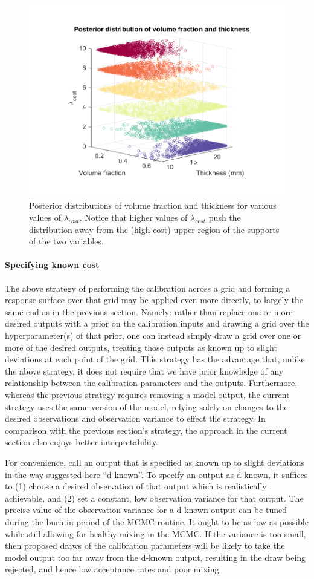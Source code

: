 \documentclass{article}
\begin{document}
\begin{figure}
\centering
\captionsetup{width=.7\linewidth}
\includegraphics[width=.65\linewidth]{FIG_post_dist_across_cost_lambda-3d}
\caption{Posterior distributions of volume fraction and thickness for various values of $\lambda_{cost}.$ Notice that higher values of $\lambda_{cost}$ push the distribution away from the (high-cost) upper region of the supports of the two variables.}
\label{fig:post_dists_lambda_cost}
\end{figure}


\paragraph{Specifying known cost}\label{known_cost}

The above strategy of performing the calibration across a grid and forming a response surface over that grid may be applied even more directly, to largely the same end as in the previous section. Namely: rather than replace one or more desired outputs with a prior on the calibration inputs and drawing a grid over the hyperparameter(s) of that prior, one can instead simply draw a grid over one or more of the desired outputs, treating those outputs as known up to slight deviations at each point of the grid. This strategy has the advantage that, unlike the above strategy, it does not require that we have prior knowledge of any relationship between the calibration parameters and the outputs. Furthermore, whereas the previous strategy requires removing a model output, the current strategy uses the same version of the model, relying solely on changes to the desired observations and observation variance to effect the strategy. In comparison with the previous section's strategy, the approach in the current section also enjoys better interpretability.

For convenience, call an output that is specified as known up to slight deviations in the way suggested here ``d-known''. To specify an output as d-known, it suffices to (1) choose a desired observation of that output which is realistically achievable, and (2) set a constant, low observation variance for that output. The precise value of the observation variance for a d-known output can be tuned during the burn-in period of the MCMC routine. It ought to be as low as possible while still allowing for healthy mixing in the MCMC. If the variance is too small, then proposed draws of the calibration parameters will be likely to take the model output too far away from the d-known output, resulting in the draw being rejected, and hence low acceptance rates and poor mixing.
\end{document}
